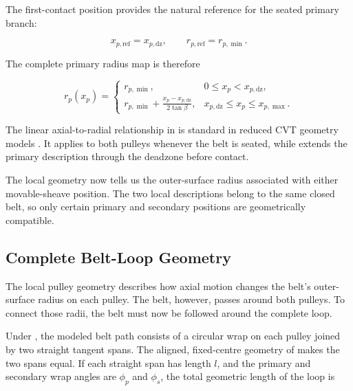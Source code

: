 \documentclass[11pt]{report}
\numberwithin{equation}{section}
\newcounter{assump}
\begin{document}
The first-contact position provides the natural reference for the seated
primary branch:

\[
x_{p,\mathrm{ref}}=x_{p,\mathrm{dz}},
\qquad
r_{p,\mathrm{ref}}=r_{p,\min}.
\]

The complete primary radius map is therefore

\begin{equation}
r_p(x_p)
=
\begin{cases}
r_{p,\min},
& 0\leq x_p<x_{p,\mathrm{dz}},\\[8pt]
\displaystyle
r_{p,\min}
+
\frac{x_p-x_{p,\mathrm{dz}}}{2\tan\beta},
& x_{p,\mathrm{dz}}\leq x_p\leq x_{p,\max}.
\end{cases}
\label{eq:primary_local_radius_map}
\end{equation}

The linear axial-to-radial relationship in
 is standard in reduced CVT geometry models
\citep{DuanEtAl2016,Ballew2015}. It applies to both pulleys whenever the belt
is seated, while  extends the primary
description through the deadzone before contact.

The local geometry now tells us the outer-surface radius associated with
either movable-sheave position. The two local descriptions belong to the same
closed belt, so only certain primary and secondary positions are geometrically
compatible.






\subsection{Complete Belt-Loop Geometry}
\label{sec:belt_loop_geometry}

The local pulley geometry describes how axial motion changes the belt's
outer-surface radius on each pulley. The belt, however, passes around both
pulleys. To connect those radii, the belt must now be followed around the
complete loop.

Under , the modeled belt path consists
of a circular wrap on each pulley joined by two straight tangent spans. The
aligned, fixed-centre geometry of  makes the two
spans equal. If each straight span has length \(l\), and the primary and
secondary wrap angles are \(\phi_p\) and \(\phi_s\), the total geometric length
of the loop is
\end{document}
